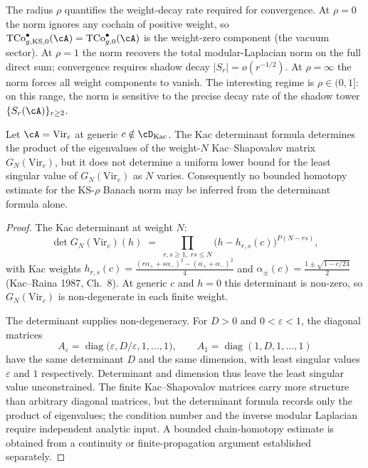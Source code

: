 \begin{remark}
\label{rem:kac-shapovalov-radius-meaning}
The radius $\rho$ quantifies the weight-decay rate required for
convergence. At $\rho = 0$ the norm ignores any cochain of positive
weight, so
$\mathrm{TCo}^{\bullet}_{g, \mathrm{KS}, 0}(\cA) =
\mathrm{TCo}^{\bullet}_{g, 0}(\cA)$ is the weight-zero component
(the vacuum sector). At $\rho = 1$ the norm recovers the total
modular-Laplacian norm on the full direct sum; convergence requires
shadow decay $\lvert S_r \rvert = o(r^{-1/2})$. At $\rho = \infty$ the
norm forces all weight components to vanish. The interesting regime
is $\rho \in (0, 1]$: on this range, the norm is sensitive to the
precise decay rate of the shadow tower $\{S_r(\cA)\}_{r \ge 2}$.
\end{remark}

\begin{proposition}
\label{prop:kac-shapovalov-eigenvalue-asymptotic}
Let $\cA = \mathrm{Vir}_c$ at generic $c \notin \cD_{\mathrm{Kac}}$.
The Kac determinant formula determines the product of the eigenvalues
of the weight-$N$ Kac--Shapovalov matrix $G_N(\mathrm{Vir}_c)$, but it
does not determine a uniform lower bound for the least singular value
of $G_N(\mathrm{Vir}_c)$ as $N$ varies. Consequently no bounded
homotopy estimate for the KS-$\rho$ Banach norm may be inferred from
the determinant formula alone.
\end{proposition}

\begin{proof}
The Kac determinant at weight $N$:
\[
 \det G_N(\mathrm{Vir}_c)(h)
 \;=\;
 \prod_{r, s \ge 1,\; r s \le N}
 \bigl(h - h_{r, s}(c)\bigr)^{P(N - r s)},
\]
with Kac weights
$h_{r, s}(c) = \frac{(r \alpha_+ + s \alpha_-)^2 - (\alpha_+ + \alpha_-)^2}{4}$
and $\alpha_\pm(c) = \frac{1 \pm \sqrt{1 - c/24}}{2}$ (Kac--Raina
1987, Ch.~8). At generic $c$ and $h=0$ this determinant is non-zero,
so $G_N(\mathrm{Vir}_c)$ is non-degenerate in each finite weight.

The determinant supplies non-degeneracy. For $D>0$ and
$0<\varepsilon<1$, the diagonal matrices
\[
 A_\varepsilon=\operatorname{diag}
 \bigl(\varepsilon, D/\varepsilon, 1,\ldots,1\bigr),
 \qquad
 A_1=\operatorname{diag}(1,D,1,\ldots,1)
\]
have the same determinant $D$ and the same dimension, with least
singular values $\varepsilon$ and $1$ respectively. Determinant and
dimension thus leave the least singular value unconstrained. The
finite Kac--Shapovalov matrices carry more structure than arbitrary
diagonal matrices, but the determinant formula records only the
product of eigenvalues; the condition number and the inverse modular
Laplacian require independent analytic input. A bounded chain-homotopy
estimate is obtained from a continuity or finite-propagation argument
established separately.
\end{proof}

